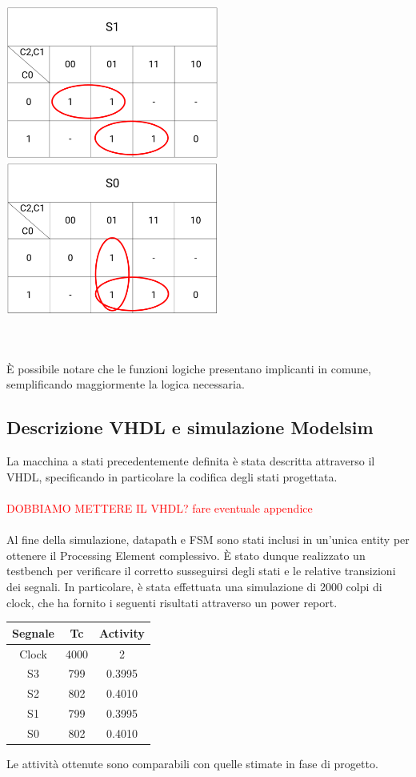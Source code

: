 \documentclass[11pt,  english, makeidx, a4paper, titlepage, oneside]{book}
\begin{document}
\\\\
\centerline{\includegraphics[width=7cm]{./img/Lab_2/K_S1.png}
			\includegraphics[width=7cm]{./img/Lab_2/K_S0.png}}
\\\\
È possibile notare che le funzioni logiche presentano implicanti in comune, semplificando maggiormente la logica necessaria.
\\
\subsection{Descrizione VHDL e simulazione Modelsim}
La macchina a stati precedentemente definita è stata descritta attraverso il VHDL, specificando in particolare la codifica degli stati progettata.
\\\\
\textcolor{red}{DOBBIAMO METTERE IL VHDL? fare eventuale appendice}
\\\\
Al fine della simulazione, datapath e FSM sono stati inclusi in un'unica entity per ottenere il Processing Element complessivo. È stato dunque realizzato un testbench per verificare il corretto susseguirsi degli stati e le relative transizioni dei segnali.
In particolare, è stata effettuata una simulazione di 2000 colpi di clock, che ha fornito i seguenti risultati attraverso un power report.
\\
\begin{center}
	\begin{tabular}{|c|c|c|}
	\hline
	Segnale & Tc & Activity \\ 
	\hline
	Clock & 4000 & 2 \\
	\hline
	S3 & 799 & 0.3995 \\
	\hline
	S2 & 802 & 0.4010 \\
	\hline
	S1 & 799 & 0.3995 \\
	\hline
	S0 & 802 & 0.4010 \\
	\hline
	\end{tabular}	
\end{center}
\vspace{0.3cm}  
Le attività ottenute sono comparabili con quelle stimate in fase di progetto.  
\\
\end{document}
